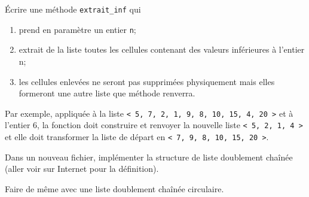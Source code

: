 \documentclass[a4paper,12pt,french]{article}
\begin{document}


\begin{exercice}
\'Ecrire une méthode \texttt{extrait\_inf} qui
\begin{enumerate}[--]
	\item 	prend en paramètre un entier \texttt{n};
	\item 	extrait de la liste  toutes les cellules contenant des valeurs inférieures à l’entier n;
    \item les cellules enlevées ne seront pas supprimées physiquement mais elles formeront une autre liste que méthode renverra.
\end{enumerate}
Par exemple, appliquée à la liste \texttt{< 5, 7, 2, 1, 9, 8, 10, 15, 4, 20 >} et à l’entier 6, la fonction doit construire et renvoyer la nouvelle liste \texttt{< 5, 2, 1, 4 >} et elle doit transformer la liste de départ en  \texttt{< 7, 9, 8, 10, 15, 20 >}.
\end{exercice}



\begin{exercice}
Dans un nouveau fichier, implémenter la structure de liste doublement chaînée (aller voir sur Internet pour la définition).
\end{exercice}

\begin{exercice}
Faire de même avec une liste doublement  chaînée circulaire.
\end{exercice}
\end{document}
